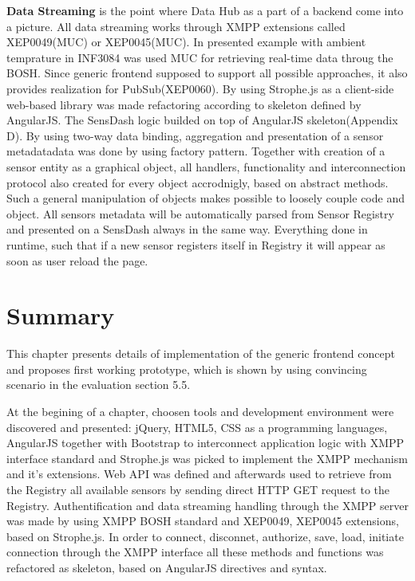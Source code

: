\textbf{Data Streaming} is the point where Data Hub as a part of a backend come into a picture. All data streaming works through XMPP extensions called XEP0049(MUC) or XEP0045(MUC). In presented example with ambient temprature in INF3084 was used MUC for retrieving real-time data throug the BOSH. Since generic frontend supposed to support all possible approaches, it also provides realization for PubSub(XEP0060). By using Strophe.js as a client-side web-based library was made refactoring according to skeleton defined by AngularJS. 
\newline
The SensDash logic builded on top of AngularJS skeleton(Appendix D). By using two-way data binding, aggregation and presentation of a sensor metadatadata was done by using factory pattern. Together with creation of a sensor entity as a graphical object, all handlers, functionality and interconnection protocol also created for every object accrodnigly, based on abstract methods. Such a general manipulation of objects makes possible to loosely couple code and object. All sensors metadata will be automatically parsed from Sensor Registry and presented on a SensDash always in the same way. Everything done in runtime, such that if a new sensor registers itself in Registry it will appear as soon as user reload the page. 

\section{Summary}
This chapter presents details of implementation of the generic frontend concept and proposes first working prototype, which is shown by using convincing scenario in the evaluation section 5.5. 

At the begining of a chapter, choosen tools and development environment were discovered and presented: jQuery, HTML5, CSS as a programming languages, AngularJS together with Bootstrap to interconnect application logic with XMPP interface standard and Strophe.js was picked to implement the XMPP mechanism and it's extensions. Web API was defined and afterwards used to retrieve from the Registry all available sensors by sending direct HTTP GET request to the Registry. Authentification and data streaming handling through the XMPP server was made by using XMPP BOSH standard and XEP0049, XEP0045 extensions, based on Strophe.js. In order to connect, disconnet, authorize, save, load, initiate connection through the XMPP interface all these methods and functions was refactored as skeleton, based on AngularJS directives and syntax. 

